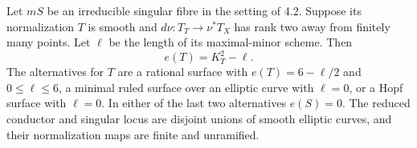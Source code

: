 
\begin{proposition}[P4.15]\hypertarget{tag-02WM}{}\label{night:P4.15}\label{stmt:P4.15}


Let $mS$ be an irreducible singular fibre in the setting of 4.2.
Suppose its normalization $T$ is smooth and $d\nu:T_T\to\nu^*T_X$
has rank two away from finitely many points. Let $\ell$ be the
length of its maximal-minor scheme. Then
\[
 e(T)=K_T^2-\ell.
\]
The alternatives for $T$ are a rational surface with
$e(T)=6-\ell/2$ and $0\leq\ell\leq6$, a minimal ruled surface
over an elliptic curve with $\ell=0$, or a Hopf surface with
$\ell=0$. In either of the last two alternatives $e(S)=0$.
The reduced conductor and singular locus are disjoint unions of
smooth elliptic curves, and their normalization maps are finite
and unramified.
\end{proposition}

